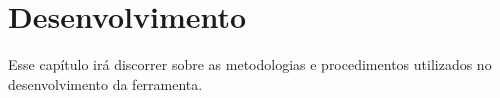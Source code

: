 \chapter{Desenvolvimento}

Esse capítulo irá discorrer sobre as metodologias e procedimentos utilizados no desenvolvimento da ferramenta.
